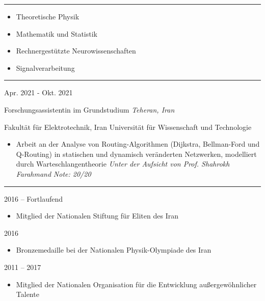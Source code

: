 \documentclass[a4paper,10pt]{article}
\newlength{\cvcolumngapwidth}
\newlength{\cvleftcolumnwidth}
\newlength{\cvrightcolumnwidth}
\newcommand{\cvsectionstyle}[1]{{\normalsize\cvsectionfont\textcolor{cvsectioncolor}{#1}}}
\newcommand{\cvtitlestyle}[1]{{\large\cvtitlefont\textcolor{cvtitlecolor}{#1}}}
\newcommand{\cvdurationstyle}[1]{{\small\cvdurationfont\textcolor{cvdurationcolor}{#1}}}
\newlength{\cvafteritemskipamount}
\newlength{\cvaftersectionskipamount}
\newlength{\cvaftertitleskipamount}
\newlength{\cvparskip}
\newcommand{\cvsection}[1]{
    \begin{minipage}[t]{\cvleftcolumnwidth}
        \raggedleft\cvsectionstyle{#1}
    \end{minipage}%
    \hspace{\cvcolumngapwidth}%
    \begin{minipage}[t]{\cvrightcolumnwidth}
        \textcolor{cvrulecolor}{\rule{\cvrightcolumnwidth}{0.3mm}}
    \end{minipage}

    \vspace{\cvaftersectionskipamount}
}
\newcommand{\cvitem}[2]{
    \begin{minipage}[t]{\cvleftcolumnwidth}
        \raggedleft #1
    \end{minipage}%
    \hspace{\cvcolumngapwidth}%
    \begin{minipage}[t]{\cvrightcolumnwidth}
        \setlength{\parskip}{\cvparskip} #2
    \end{minipage}

    \vspace{\cvafteritemskipamount}
}
\newcommand{\cvtitle}[1]{
    \cvtitlestyle{#1}

    \vspace{\cvaftertitleskipamount}
    \vspace{-\cvparskip}
}
\begin{document}
\cvsection{FORSCHUNGSINTERESSE}
\cvitem{\;}{
    \begin{itemize}[leftmargin=*]
        \item Theoretische Physik
        \item Mathematik und Statistik
        \item Rechnergestützte Neurowissenschaften
        \item Signalverarbeitung
    \end{itemize}
}

\cvsection{FORSCHUNGSERFAHRUNG}
\cvitem{
    \cvdurationstyle{Apr. 2021 - Okt. 2021}
}{
    \cvtitle{{Forschungsassistentin im Grundstudium} \hfill{\textnormal{\textit{Teheran, Iran}}}}
    {Fakultät für Elektrotechnik, Iran Universität für Wissenschaft und Technologie}
    \begin{itemize}[leftmargin=*]
        \item Arbeit an der Analyse von Routing-Algorithmen (Dijkstra, Bellman-Ford und Q-Routing) in statischen und dynamisch veränderten Netzwerken, modelliert durch Warteschlangentheorie
              \newline
              \textit{\small{Unter der Aufsicht von Prof. Shahrokh Farahmand}}
              \newline
              \textit{\small{Note: 20/20}}
    \end{itemize}
}

\cvsection{AUSZEICHNUNGEN UND EHRUNGEN}
\cvitem{
    \cvdurationstyle{2016 – Fortlaufend}
}{
    \begin{itemize}[leftmargin=*]
        \item Mitglied der Nationalen Stiftung für Eliten des Iran
    \end{itemize}
}
\vspace{-4mm}
\cvitem{
    \cvdurationstyle{2016}
}{
    \begin{itemize}[leftmargin=*]
        \item Bronzemedaille bei der Nationalen Physik-Olympiade des Iran
    \end{itemize}
}
\vspace{-4mm}
\cvitem{
    \cvdurationstyle{2011 – 2017}
}{
    \begin{itemize}[leftmargin=*]
        \item Mitglied der Nationalen Organisation für die Entwicklung außergewöhnlicher Talente
    \end{itemize}
}

\end{document}
